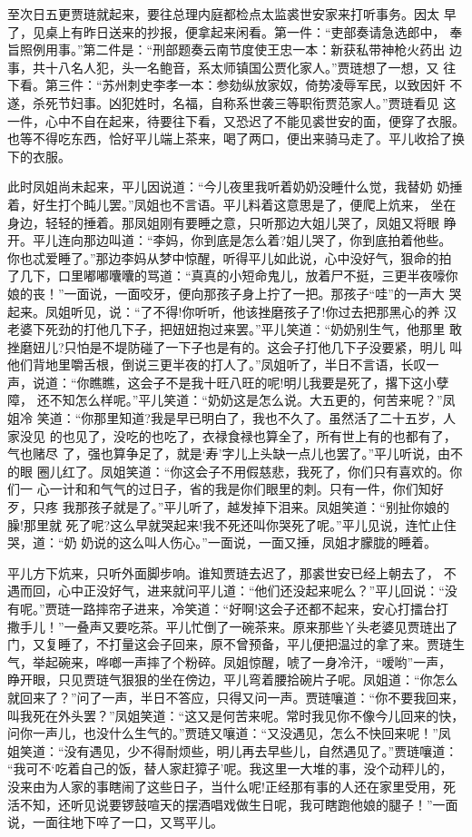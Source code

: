 至次日五更贾琏就起来，要往总理内庭都检点太监裘世安家来打听事务。因太
早了，见桌上有昨日送来的抄报，便拿起来闲看。第一件：“吏部奏请急选郎中，
奉旨照例用事。”第二件是：“刑部题奏云南节度使王忠一本：新获私带神枪火药出
边事，共十八名人犯，头一名鲍音，系太师镇国公贾化家人。”贾琏想了一想，又
往下看。第三件：“苏州刺史李孝一本：参劾纵放家奴，倚势凌辱军民，以致因奸
不遂，杀死节妇事。凶犯姓时，名福，自称系世袭三等职衔贾范家人。”贾琏看见
这一件，心中不自在起来，待要往下看，又恐迟了不能见裘世安的面，便穿了衣服。
也等不得吃东西，恰好平儿端上茶来，喝了两口，便出来骑马走了。平儿收拾了换
下的衣服。

此时凤姐尚未起来，平儿因说道：“今儿夜里我听着奶奶没睡什么觉，我替奶
奶捶着，好生打个盹儿罢。”凤姐也不言语。平儿料着这意思是了，便爬上炕来，
坐在身边，轻轻的捶着。那凤姐刚有要睡之意，只听那边大姐儿哭了，凤姐又将眼
睁开。平儿连向那边叫道：“李妈，你到底是怎么着?姐儿哭了，你到底拍着他些。
你也忒爱睡了。”那边李妈从梦中惊醒，听得平儿如此说，心中没好气，狠命的拍
了几下，口里嘟嘟囔囔的骂道：“真真的小短命鬼儿，放着尸不挺，三更半夜嚎你
娘的丧！”一面说，一面咬牙，便向那孩子身上拧了一把。那孩子“哇”的一声大
哭起来。凤姐听见，说：“了不得!你听听，他该挫磨孩子了!你过去把那黑心的养
汉老婆下死劲的打他几下子，把妞妞抱过来罢。”平儿笑道：“奶奶别生气，他那里
敢挫磨妞儿?只怕是不堤防碰了一下子也是有的。这会子打他几下子没要紧，明儿
叫他们背地里嚼舌根，倒说三更半夜的打人了。”凤姐听了，半日不言语，长叹一
声，说道：“你瞧瞧，这会子不是我十旺八旺的呢!明儿我要是死了，撂下这小孽障，
还不知怎么样呢。”平儿笑道：“奶奶这是怎么说。大五更的，何苦来呢？”凤姐冷
笑道：“你那里知道?我是早已明白了，我也不久了。虽然活了二十五岁，人家没见
的也见了，没吃的也吃了，衣禄食禄也算全了，所有世上有的也都有了，气也赌尽
了，强也算争足了，就是‘寿’字儿上头缺一点儿也罢了。”平儿听说，由不的眼
圈儿红了。凤姐笑道：“你这会子不用假慈悲，我死了，你们只有喜欢的。你们一
心一计和和气气的过日子，省的我是你们眼里的刺。只有一件，你们知好歹，只疼
我那孩子就是了。”平儿听了，越发掉下泪来。凤姐笑道：“别扯你娘的臊!那里就
死了呢?这么早就哭起来!我不死还叫你哭死了呢。”平儿见说，连忙止住哭，道：“奶
奶说的这么叫人伤心。”一面说，一面又捶，凤姐才朦胧的睡着。

平儿方下炕来，只听外面脚步响。谁知贾琏去迟了，那裘世安已经上朝去了，
不遇而回，心中正没好气，进来就问平儿道：“他们还没起来呢么？”平儿回说：“没
有呢。”贾琏一路摔帘子进来，冷笑道：“好啊!这会子还都不起来，安心打擂台打
撒手儿！”一叠声又要吃茶。平儿忙倒了一碗茶来。原来那些丫头老婆见贾琏出了
门，又复睡了，不打量这会子回来，原不曾预备，平儿便把温过的拿了来。贾琏生
气，举起碗来，哗啷一声摔了个粉碎。凤姐惊醒，唬了一身冷汗，“嗳哟”一声，
睁开眼，只见贾琏气狠狠的坐在傍边，平儿弯着腰拾碗片子呢。凤姐道：“你怎么
就回来了？”问了一声，半日不答应，只得又问一声。贾琏嚷道：“你不要我回来，
叫我死在外头罢？”凤姐笑道：“这又是何苦来呢。常时我见你不像今儿回来的快，
问你一声儿，也没什么生气的。”贾琏又嚷道：“又没遇见，怎么不快回来呢！”凤
姐笑道：“没有遇见，少不得耐烦些，明儿再去早些儿，自然遇见了。”贾琏嚷道：
“我可不‘吃着自己的饭，替人家赶獐子’呢。我这里一大堆的事，没个动秤儿的，
没来由为人家的事瞎闹了这些日子，当什么呢!正经那有事的人还在家里受用，死
活不知，还听见说要锣鼓喧天的摆酒唱戏做生日呢，我可瞎跑他娘的腿子！”一面
说，一面往地下啐了一口，又骂平儿。


